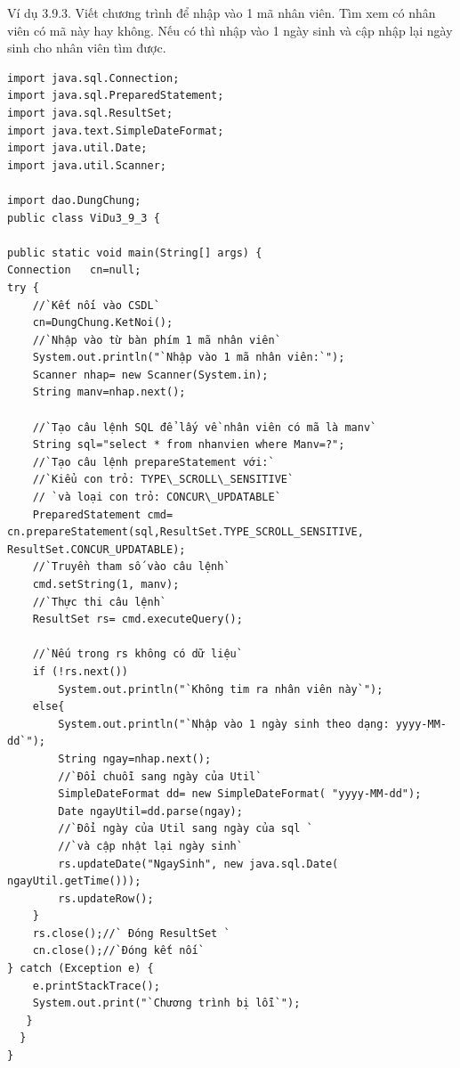 Ví dụ 3.9.3. Viết chương trình để nhập vào 1 mã nhân viên. Tìm xem có nhân viên có mã này hay không. Nếu có thì nhập vào 1 ngày sinh và cập nhập lại ngày sinh cho nhân viên tìm được.
\begin{lstlisting}[escapechar=`]
import java.sql.Connection;
import java.sql.PreparedStatement;
import java.sql.ResultSet;
import java.text.SimpleDateFormat;
import java.util.Date;
import java.util.Scanner;

import dao.DungChung;
public class ViDu3_9_3 {

public static void main(String[] args) {
Connection   cn=null;
try { 
	//`Kết nối vào CSDL`
	cn=DungChung.KetNoi();
	//`Nhập vào từ bàn phím 1 mã nhân viên`
	System.out.println("`Nhập vào 1 mã nhân viên:`");
	Scanner nhap= new Scanner(System.in);
	String manv=nhap.next();
	
	//`Tạo câu lệnh SQL để lấy về nhân viên có mã là manv`
	String sql="select * from nhanvien where Manv=?";
	//`Tạo câu lệnh prepareStatement với:`
	//`Kiểu con trỏ: TYPE\_SCROLL\_SENSITIVE`
	// `và loại con trỏ: CONCUR\_UPDATABLE`
	PreparedStatement cmd= cn.prepareStatement(sql,ResultSet.TYPE_SCROLL_SENSITIVE, ResultSet.CONCUR_UPDATABLE);
	//`Truyền tham số vào câu lệnh`
	cmd.setString(1, manv);
	//`Thực thi câu lệnh`
	ResultSet rs= cmd.executeQuery();
	
	//`Nếu trong rs không có dữ liệu`
	if (!rs.next())
		System.out.println("`Không tim ra nhân viên này`");
	else{
		System.out.println("`Nhập vào 1 ngày sinh theo dạng: yyyy-MM-dd`");
		String ngay=nhap.next();
		//`Đổi chuỗi sang ngày của Util`
		SimpleDateFormat dd= new SimpleDateFormat( "yyyy-MM-dd");
		Date ngayUtil=dd.parse(ngay);
		//`Đổi ngày của Util sang ngày của sql `
		//`và cập nhật lại ngày sinh`
		rs.updateDate("NgaySinh", new java.sql.Date( ngayUtil.getTime()));
		rs.updateRow();
	}
	rs.close();//` Đóng ResultSet `
	cn.close();//`Đóng kết nối`
} catch (Exception e) {
	e.printStackTrace();
	System.out.print("`Chương trình bị lỗi`");
   }
  }
}
\end{lstlisting}
